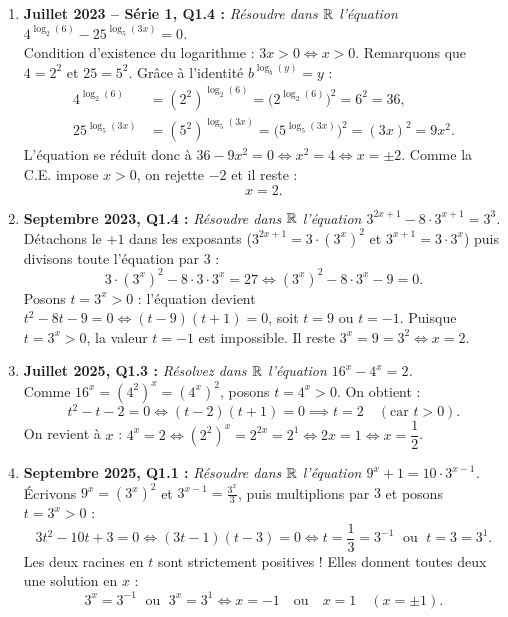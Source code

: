 \begin{exemple}
\begin{enumerate}
    \item \textbf{Juillet 2023 -- Série 1, Q1.4 :} \emph{Résoudre dans $\mathbb{R}$ l'équation $4^{\log_2(6)} - 25^{\log_5(3x)} = 0$.}\\
    Condition d'existence du logarithme : $3x > 0 \iff x > 0$.
    Remarquons que $4 = 2^2$ et $25 = 5^2$. Grâce à l'identité $b^{\log_b(y)} = y$ :
    \begin{align*}
        4^{\log_2(6)} &= (2^2)^{\log_2(6)} = \bigl(2^{\log_2(6)}\bigr)^2 = 6^2 = 36, \\
        25^{\log_5(3x)} &= (5^2)^{\log_5(3x)} = \bigl(5^{\log_5(3x)}\bigr)^2 = (3x)^2 = 9x^2.
    \end{align*}
    L'équation se réduit donc à $36 - 9x^2 = 0 \iff x^2 = 4 \iff x = \pm 2$. Comme la C.E. impose $x > 0$, on rejette $-2$ et il reste :
    \[
        \boxed{x = 2}.
    \]

    \item \textbf{Septembre 2023, Q1.4 :} \emph{Résoudre dans $\mathbb{R}$ l'équation $3^{2x+1} - 8\cdot 3^{x+1} = 3^3$.}\\
    Détachons le $+1$ dans les exposants ($3^{2x+1} = 3\cdot (3^x)^2$ et $3^{x+1} = 3\cdot 3^x$) puis divisons toute l'équation par $3$ :
    \[
        3\cdot(3^x)^2 - 8\cdot 3\cdot 3^x = 27 \iff (3^x)^2 - 8\cdot 3^x - 9 = 0.
    \]
    Posons $t = 3^x > 0$ : l'équation devient $t^2 - 8t - 9 = 0 \iff (t - 9)(t + 1) = 0$, soit $t = 9$ ou $t = -1$.
    Puisque $t = 3^x > 0$, la valeur $t = -1$ est impossible. Il reste $3^x = 9 = 3^2 \iff \boxed{x = 2}$.

    \item \textbf{Juillet 2025, Q1.3 :} \emph{Résolvez dans $\mathbb{R}$ l'équation $16^x - 4^x = 2$.}\\
    Comme $16^x = (4^2)^x = (4^x)^2$, posons $t = 4^x > 0$. On obtient :
    \[
        t^2 - t - 2 = 0 \iff (t - 2)(t + 1) = 0 \implies t = 2 \quad (\text{car } t > 0).
    \]
    On revient à $x$ : $4^x = 2 \iff (2^2)^x = 2^{2x} = 2^1 \iff 2x = 1 \iff \boxed{x = \dfrac{1}{2}}$.

    \item \textbf{Septembre 2025, Q1.1 :} \emph{Résoudre dans $\mathbb{R}$ l'équation $9^x + 1 = 10\cdot 3^{x-1}$.}\\
    Écrivons $9^x = (3^x)^2$ et $3^{x-1} = \frac{3^x}{3}$, puis multiplions par $3$ et posons $t = 3^x > 0$ :
    \[
        3t^2 - 10t + 3 = 0 \iff (3t - 1)(t - 3) = 0 \iff t = \frac{1}{3} = 3^{-1} \;\text{ ou }\; t = 3 = 3^1.
    \]
    Les deux racines en $t$ sont strictement positives ! Elles donnent toutes deux une solution en $x$ :
    \[
        3^x = 3^{-1} \;\text{ ou }\; 3^x = 3^1 \iff \boxed{x = -1 \quad \text{ou} \quad x = 1 \quad (x = \pm 1)}.
    \]


\end{enumerate}
\end{exemple}
